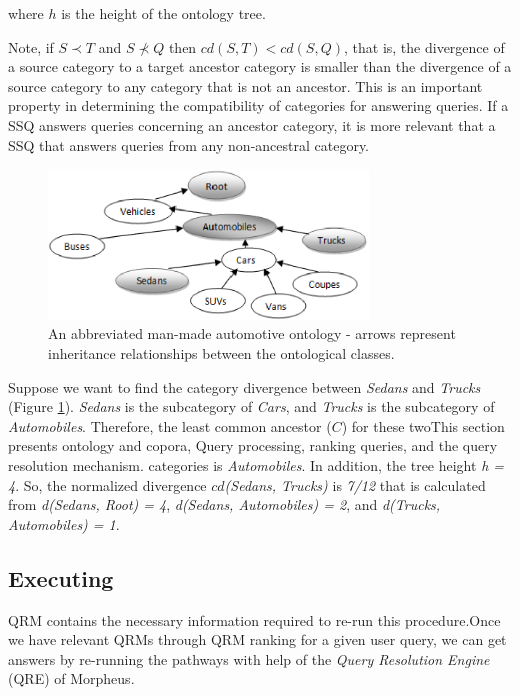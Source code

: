 \noindent where $h$ is the height of the ontology tree.

Note, if $S \prec T$ and $S \not\prec Q$ then $cd(S,T) <
cd(S,Q)$, that is, the divergence of a source category to a target
ancestor category is smaller than the divergence of a source category to any
category that is not an ancestor. This is an important property in
determining the compatibility of categories for answering queries.  If a
SSQ answers queries concerning an ancestor category, it is more relevant
that a SSQ that answers queries from any non-ancestral category.

\begin{figure}[t]
\centering
\includegraphics[width=85mm]{img/automotive_ontology.eps}
\caption{An abbreviated man-made automotive ontology - arrows represent inheritance relationships between the ontological classes.}
\label{fig:automotive_ontology}
\end{figure}

Suppose we want to find the category divergence between \textit{Sedans}
and \textit{Trucks} (Figure \ref{fig:automotive_ontology}). 
\textit{Sedans} is the subcategory of \textit{Cars}, and \textit{Trucks}
is the subcategory of \textit{Automobiles}. Therefore, the least common ancestor ($C$)
for these twoThis section presents ontology and copora, Query processing, ranking queries, and the query resolution mechanism. categories is \textit{Automobiles}. In addition, the tree height \textit{h = 4}.
So, the normalized divergence $cd$\textit{(Sedans, Trucks)} is \textit{7/12}
that is calculated from \textit{d(Sedans, Root) = 4}, \textit{d(Sedans, Automobiles) = 2}, and \textit{d(Trucks, Automobiles) = 1}.


\subsection{Executing} 

QRM contains the necessary  
information required to re-run this procedure.Once we have 
relevant QRMs through QRM ranking for a given user query, we can  
get answers by re-running the pathways with help of 
the \emph{Query Resolution Engine} (QRE) of Morpheus. 